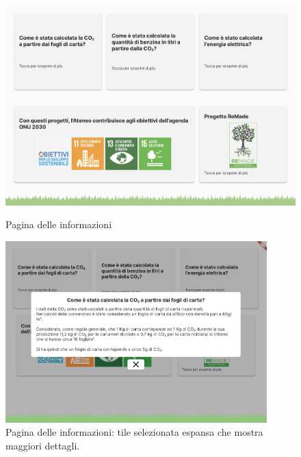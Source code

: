 \begin{figure}
  \centering
  \begin{minipage}[h]{0.9\linewidth}
    \centering
    \includegraphics[width=\textwidth]{img/totem/screenshot/infoPageScreen.png}
    \caption{Pagina delle informazioni}
    \label{fig:infoPage}
  \end{minipage}
  \vfill
  \vspace{0.2 cm}
  \centering
  \begin{minipage}[h]{\linewidth}
    \centering
    \includegraphics[width=0.9\textwidth]{img/totem/screenshot/infoPagePopupScreen.png}
    \caption{Pagina delle informazioni: tile selezionata espansa che mostra maggiori dettagli.}
    \label{fig:infoPagePopup}
  \end{minipage}
\end{figure}
